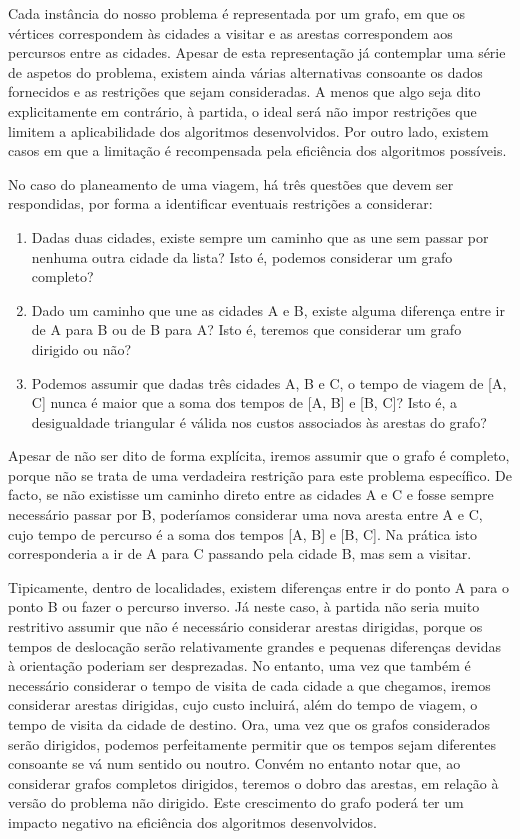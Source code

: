 \documentclass[12pt,a4paper,reqno]{report}
\numberwithin{equation}{section}
\begin{document}
Cada instância do nosso problema é representada por um grafo, em que os vértices correspondem às cidades a visitar e as arestas correspondem aos percursos entre as cidades. Apesar de esta representação já contemplar uma série de aspetos do problema, existem ainda várias alternativas consoante os dados fornecidos e as restrições que sejam consideradas. A menos que algo seja dito explicitamente em contrário, à partida, o ideal será não impor restrições que limitem a aplicabilidade dos algoritmos desenvolvidos. Por outro lado, existem casos em que a limitação é recompensada pela eficiência dos algoritmos possíveis.

No caso do planeamento de uma viagem, há três questões que devem ser respondidas, por forma a identificar eventuais restrições a considerar:
\begin{enumerate}
	\item Dadas duas cidades, existe sempre um caminho que as une sem passar por nenhuma outra cidade da lista? Isto é, podemos considerar um grafo completo?
	\item Dado um caminho que une as cidades A e B, existe alguma diferença entre ir de A para B ou de B para A? Isto é, teremos que considerar um grafo dirigido ou não?
	\item Podemos assumir que dadas três cidades A, B e C, o tempo de viagem de [A, C] nunca é maior que a soma dos tempos de [A, B] e [B, C]? Isto é, a desigualdade triangular é válida nos custos associados às arestas do grafo?
\end{enumerate}

Apesar de não ser dito de forma explícita, iremos assumir que o grafo é completo, porque não se trata de uma verdadeira restrição para este problema específico. De facto, se não existisse um caminho direto entre as cidades A e C e fosse sempre necessário passar por B, poderíamos considerar uma nova aresta entre A e C, cujo tempo de percurso é a soma dos tempos [A, B] e [B, C]. Na prática isto corresponderia a ir de A para C passando pela cidade B, mas sem a visitar.

Tipicamente, dentro de localidades, existem diferenças entre ir do ponto A para o ponto B ou fazer o percurso inverso. Já neste caso, à partida não seria muito restritivo assumir que não é necessário considerar arestas dirigidas, porque os tempos de deslocação serão relativamente grandes e pequenas diferenças devidas à orientação poderiam ser desprezadas. No entanto, uma vez que também é necessário considerar o tempo de visita de cada cidade a que chegamos, iremos considerar arestas dirigidas, cujo custo incluirá, além do tempo de viagem, o tempo de visita da cidade de destino. Ora, uma vez que os grafos considerados serão dirigidos, podemos perfeitamente permitir que os tempos sejam diferentes consoante se vá num sentido ou noutro. Convém no entanto notar que, ao considerar grafos completos dirigidos, teremos o dobro das arestas, em relação à versão do problema não dirigido. Este crescimento do grafo poderá ter um impacto negativo na eficiência dos algoritmos desenvolvidos.
\end{document}
